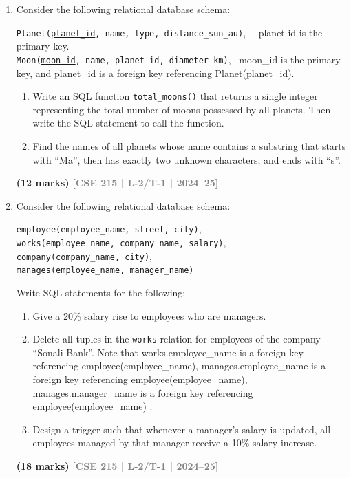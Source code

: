 \documentclass[12pt,a3paper]{article}
\newcommand{\yr}[1]{\hfill\textcolor{gray}{\small\textbf{[#1]}}}
\newcommand{\mk}[1]{\textcolor{orange!70!black}{\small\textbf{(#1 marks)}}}
\begin{document}
\begin{enumerate}

\item Consider the following relational database schema:
\begin{center}
\texttt{Planet(\underline{planet\_id}, name, type, distance\_sun\_au)},\quad --- planet-id is the primary key.
\\ \texttt{Moon(\underline{moon\_id}, name, planet\_id, diameter\_km)}, \ moon_id is the primary key, and planet_id is a foreign key referencing Planet(planet_id). 
\end{center}
\begin{enumerate}
  \item Write an SQL function \texttt{total\_moons()} that returns a single integer representing the total number of moons possessed by all planets. Then write the SQL statement to call the function.
  \item Find the names of all planets whose name contains a substring that starts with ``Ma'', then has exactly two unknown characters, and ends with ``s''.
\end{enumerate}
\mk{12} \yr{CSE 215 | L-2/T-1 | 2024--25}

\item Consider the following relational database schema:
\begin{center}
\texttt{employee(employee\_name, street, city)},\quad \\\texttt{works(employee\_name, company\_name, salary)},\\
\texttt{company(company\_name, city)},\quad \\\texttt{manages(employee\_name, manager\_name)}
\end{center}
Write SQL statements for the following:
\begin{enumerate}
  \item Give a 20\% salary rise to employees who are managers.
  \item Delete all tuples in the \texttt{works} relation for employees of the company ``Sonali Bank''. 
  Note that works.employee_name is a foreign key referencing employee(employee_name),
 manages.employee_name is a foreign key referencing employee(employee_name),
 manages.manager_name is a foreign key referencing employee(employee_name) .
  \item Design a trigger such that whenever a manager's salary is updated, all employees managed by that manager receive a 10\% salary increase.
\end{enumerate}
\mk{18} \yr{CSE 215 | L-2/T-1 | 2024--25}


\end{enumerate}
\end{document}
